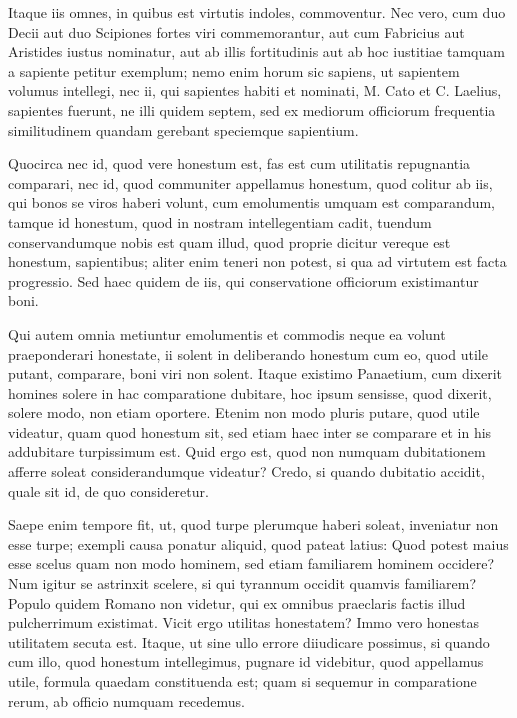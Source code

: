  Itaque iis omnes, in quibus est virtutis indoles, commoventur. Nec vero, cum duo Decii aut duo Scipiones fortes viri commemorantur, aut cum Fabricius aut Aristides iustus nominatur, aut ab illis fortitudinis aut ab hoc iustitiae tamquam a sapiente petitur exemplum; nemo enim horum sic sapiens, ut sapientem volumus intellegi, nec ii, qui sapientes habiti et nominati, M. Cato et C. Laelius, sapientes fuerunt, ne illi quidem septem, sed ex mediorum officiorum frequentia similitudinem quandam gerebant speciemque sapientium.

 Quocirca nec id, quod vere honestum est, fas est cum utilitatis repugnantia comparari, nec id, quod communiter appellamus honestum, quod colitur ab iis, qui bonos se viros haberi volunt, cum emolumentis umquam est comparandum, tamque id honestum, quod in nostram intellegentiam cadit, tuendum conservandumque nobis est quam illud, quod proprie dicitur vereque est honestum, sapientibus; aliter enim teneri non potest, si qua ad virtutem est facta progressio. Sed haec quidem de iis, qui conservatione officiorum existimantur boni.

 Qui autem omnia metiuntur emolumentis et commodis neque ea volunt praeponderari honestate, ii solent in deliberando honestum cum eo, quod utile putant, comparare, boni viri non solent. Itaque existimo Panaetium, cum dixerit homines solere in hac comparatione dubitare, hoc ipsum sensisse, quod dixerit, solere modo, non etiam oportere. Etenim non modo pluris putare, quod utile videatur, quam quod honestum sit, sed etiam haec inter se comparare et in his addubitare turpissimum est. Quid ergo est, quod non numquam dubitationem afferre soleat considerandumque videatur? Credo, si quando dubitatio accidit, quale sit id, de quo consideretur.

 Saepe enim tempore fit, ut, quod turpe plerumque haberi soleat, inveniatur non esse turpe; exempli causa ponatur aliquid, quod pateat latius: Quod potest maius esse scelus quam non modo hominem, sed etiam familiarem hominem occidere? Num igitur se astrinxit scelere, si qui tyrannum occidit quamvis familiarem? Populo quidem Romano non videtur, qui ex omnibus praeclaris factis illud pulcherrimum existimat. Vicit ergo utilitas honestatem? Immo vero honestas utilitatem secuta est. Itaque, ut sine ullo errore diiudicare possimus, si quando cum illo, quod honestum intellegimus, pugnare id videbitur, quod appellamus utile, formula quaedam constituenda est; quam si sequemur in comparatione rerum, ab officio numquam recedemus.

